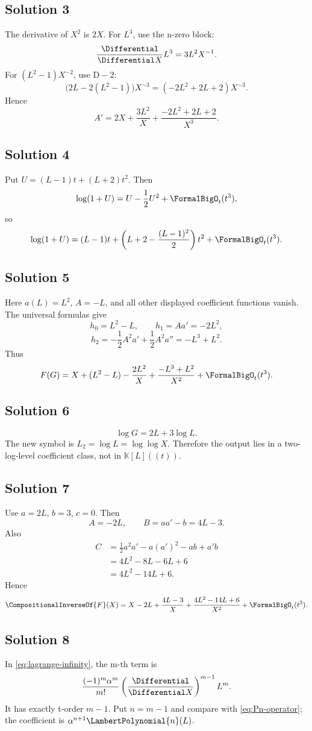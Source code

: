 \documentclass[11pt,openany]{book}
\theoremstyle{definition}
\theoremstyle{plain}
\theoremstyle{remark}
\newcommand{\K}{\mathbb{K}}
\newcommand{\rev}[1]{\CompositionalInverseOf{#1}}
\newcommand{\Dop}{\mathrm{D}}
\begin{document}
\subsection*{Solution 3}
The derivative of \(X^2\) is \(2X\).  For \(L^3\), use the n-zero block:
\[
 \frac{\Differential}{\Differential X}L^3=3L^2X^{-1}.
\]
For \((L^2-1)X^{-2}\), use \(\Dop-2\):
\[
 \bigl(2L-2(L^2-1)\bigr)X^{-3}
 =(-2L^2+2L+2)X^{-3}.
\]
Hence
\[
 A'=2X+\frac{3L^2}{X}
 +\frac{-2L^2+2L+2}{X^3}.
\]

\subsection*{Solution 4}
Put \(U=(L-1)t+(L+2)t^2\).  Then
\[
 \log(1+U)=U-\frac12U^2+\FormalBigO_t(t^3),
\]
so
\[
 \log(1+U)
 =(L-1)t+
 \left(L+2-\frac{(L-1)^2}{2}\right)t^2+\FormalBigO_t(t^3).
\]

\subsection*{Solution 5}
Here \(a(L)=L^2\), \(A=-L\), and all other displayed coefficient functions
vanish.  The universal formulas give
\[
 h_0=L^2-L,
 \qquad
 h_1=Aa'=-2L^2,
\]
\[
 h_2=-\frac12A^2a'+\frac12A^2a''
 =-L^3+L^2.
\]
Thus
\[
 F(G)=X+(L^2-L)-\frac{2L^2}{X}
 +\frac{-L^3+L^2}{X^2}+\FormalBigO_t(t^3).
\]

\subsection*{Solution 6}
\[
 \log G=2L+3\log L.
\]
The new symbol is \(L_2=\log L=\log\log X\).  Therefore the output lies in a
two-log-level coefficient class, not in \(\K[L]((t))\).

\subsection*{Solution 7}
Use \(a=2L\), \(b=3\), \(c=0\).  Then
\[
 A=-2L,
 \qquad
 B=aa'-b=4L-3.
\]
Also
\begin{align*}
 C&=\frac12a^2a'-a(a')^2-ab+a'b\\
 &=4L^2-8L-6L+6\\
 &=4L^2-14L+6.
\end{align*}
Hence
\[
 \rev F(X)=X-2L+\frac{4L-3}{X}
 +\frac{4L^2-14L+6}{X^2}+\FormalBigO_t(t^3).
\]

\subsection*{Solution 8}
In \cref{eq:lagrange-infinity}, the m-th term is
\[
 \frac{(-1)^m\alpha^m}{m!}
 \left(\frac{\Differential}{\Differential X}\right)^{m-1}L^m.
\]
It has exactly t-order \(m-1\).  Put \(n=m-1\) and compare with
\cref{eq:Pn-operator}; the coefficient is \(\alpha^{n+1}\LambertPolynomial{n}(L)\).
\end{document}
